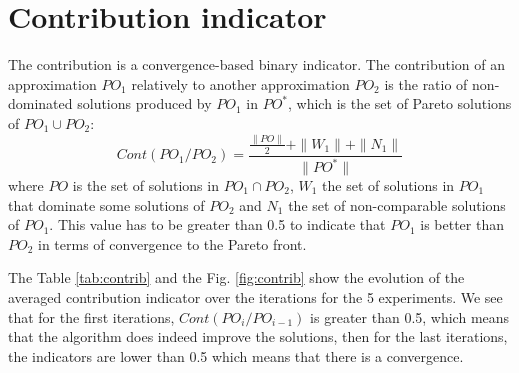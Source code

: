 
\section{Contribution indicator}
\label{app:cont}
The contribution is a convergence-based binary indicator. The contribution of an approximation $PO_1$ relatively to another approximation $PO_2$ is the ratio of non-dominated solutions produced by $PO_1$ in $PO^*$, which is the set of Pareto solutions of $PO_1 \cup PO_2$:
\begin{equation}
Cont(PO_1/PO_2) = \frac{\frac{\|PO\|}{2}+\|W_1\|+\|N_1\|}{\|PO^*\|}
\end{equation}
where $PO$ is the set of solutions in $PO_1 \cap PO_2$, $W_1$ the set of solutions in $PO_1$ that dominate some solutions of $PO_2$ and $N_1$ the set of non-comparable solutions of $PO_1$. This value has to be greater than 0.5 to indicate that $PO_1$ is better than $PO_2$ in terms of convergence to the Pareto front.

The Table \ref{tab:contrib} and the Fig. \ref{fig:contrib} show the evolution of the averaged contribution indicator over the iterations for the 5 experiments. We see that for the first iterations, $Cont(PO_i/PO_{i-1})$ is greater than 0.5, which means that the algorithm does indeed improve the solutions, then for the last iterations, the indicators are lower than 0.5 which means that there is a convergence.

